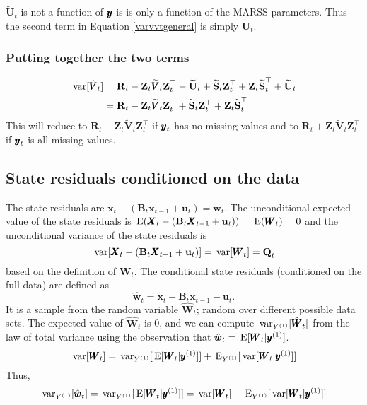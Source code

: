 \documentclass[]{article}
\def\UPS{\mbox{\boldmath $\Upsilon$}}
\def\XI{\mbox{\boldmath $\Xi$}}
\def\BB{\mbox{$\mathbf B$}}	\def\bb{\mbox{$\mathbf b$}} \def\Bb{\mbox{$\mathbf J$}} \def\Ba{\mbox{$\mathbf L$}} \def\Bm{\UPS}
\def\E{\,\textup{\textrm{E}}}
\def\QQ{\mbox{$\mathbf Q$}}	 \def\qq{\mbox{$\mathbf q$}} \def\Qb{\mbox{$\mathbf G$}}  \def\Qm{\mathbb{Q}}
\def\RR{\mbox{$\mathbf R$}}	 \def\rr{\mbox{$\mathbf r$}} \def\Rb{\mbox{$\mathbf H$}}	\def\Rm{\mathbb{R}}
\def\Ss{\mbox{$\mathbf S$}}
\def\UU{\mbox{$\mathbf U$}}	\def\uu{\mbox{$\mathbf u$}}
\def\VV{\mbox{$\pmb{V}$}}	\def\vv{\mbox{$\pmb{v}$}}
\def\WW{\mbox{$\pmb{W}$}}	\def\ww{\mbox{$\pmb{w}$}}
\def\XX{\mbox{$\pmb{X}$}}	\def\xx{\mbox{$\pmb{x}$}}
\def\ZZ{\mbox{$\mathbf Z$}}	\def\zz{\mbox{$\mathbf z$}}	\def\Zb{\mbox{$\mathbf M$}} \def\Za{\mbox{$\mathbf N$}} \def\Zm{\XI}
\def\var{\,\textup{\textrm{var}}}
\def\hatxt{\widetilde{\xx}_t}
\def\hatxtm{\widetilde{\mbox{$\xx$}}_{t-1}}
\def\hatVt{\widetilde{\VV}_t}
\def\hatUt{\widetilde{\UU}_t}
\def\hatSt{\widetilde{\Ss}_t}
\begin{document}
$\hatUt$ is not a function of $\mbox{$\pmb{y}$}$ is is only a function of the MARSS parameters.  Thus the second term in Equation \ref{varvvtgeneral} is simply $\hatUt$.

\subsubsection{Putting together the two terms}
\begin{equation}
\begin{split}
\var[\hat{\VV}_t] &= \RR_t - \ZZ_t \hatVt \ZZ_t^\top - \hatUt + \hatSt\ZZ_t^\top + \ZZ_t\hatSt^\top + \hatUt\\
&= \RR_t - \ZZ_t \hatVt \ZZ_t^\top + \hatSt\ZZ_t^\top + \ZZ_t\hatSt^\top
\end{split}
\end{equation}
This will reduce to $\RR_t - \ZZ_t \hatVt \ZZ_t^\top$ if $\mbox{$\pmb{y}$}_t$ has no missing values and to $\RR_t + \ZZ_t \hatVt \ZZ_t^\top$ if $\mbox{$\pmb{y}$}_t$ is all missing values.

\subsection{State residuals conditioned on the data}
The state residuals are $\xx_t - (\BB_t \xx_{t-1} + \uu_t)=\ww_t$.  The unconditional expected value of the state residuals is $\E(\XX_t - (\BB_t \XX_{t-1} + \uu_t)) = \E(\WW_t) = 0$ and the unconditional variance of the state residuals is
\begin{equation}
\var[\XX_t - (\BB_t \XX_{t-1} + \uu_t)] = \var[\WW_t] = \QQ_t
\end{equation}
based on the definition of $\WW_t$.
The conditional state residuals (conditioned on the full data) are defined as
\begin{equation}
\hat{\ww}_t = \hatxt - \BB_t\hatxtm - \uu_t.
\end{equation}
It is a sample from the random variable $\hat{\WW}_t$; random over different possible data sets.  The expected value of $\hat{\WW}_t$ is 0, and we can compute $\var_{Y^{(1)}}[\hat{\WW}_t]$ from the law of total variance using the observation that $\hat{\ww}_t=\E[\WW_t|\yy^{(1)}]$.
\begin{equation}
\var[\WW_t] = \var_{Y^{(1)}}[\E[\WW_t|\yy^{(1)}]] + \E_{Y^{(1)}}[\var[\WW_t|\yy^{(1)}]]
\end{equation}
Thus,
\begin{equation}\label{eqn:var.wtt1}
\var_{Y^{(1)}}[\hat{\ww}_t] = \var_{Y^{(1)}}[\E[\WW_t|\yy^{(1)}]] = \var[\WW_t] - \E_{Y^{(1)}}[\var[\WW_t|\yy^{(1)}]]
\end{equation}
\end{document}
